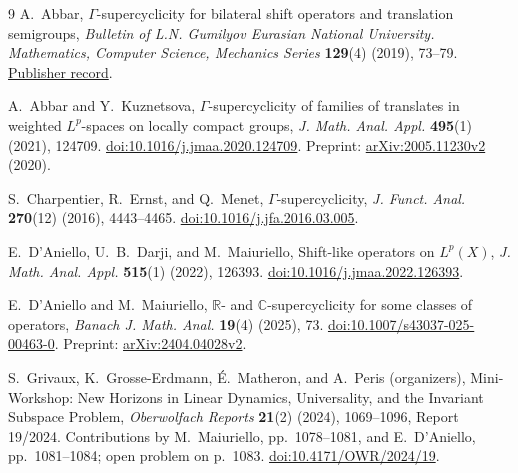 \documentclass[11pt]{article}
\theoremstyle{remark}
\begin{document}
\begin{thebibliography}{9}
A.~Abbar, $\Gamma$-supercyclicity for bilateral shift operators and translation semigroups, \emph{Bulletin of L.N. Gumilyov Eurasian National University. Mathematics, Computer Science, Mechanics Series} \textbf{129}(4) (2019), 73--79. \href{https://bulmathmc.enu.kz/index.php/main/article/view/55}{Publisher record}.

A.~Abbar and Y.~Kuznetsova, $\Gamma$-supercyclicity of families of translates in weighted $L^p$-spaces on locally compact groups, \emph{J. Math. Anal. Appl.} \textbf{495}(1) (2021), 124709. \href{https://doi.org/10.1016/j.jmaa.2020.124709}{doi:10.1016/j.jmaa.2020.124709}. Preprint: \href{https://arxiv.org/abs/2005.11230v2}{arXiv:2005.11230v2} (2020).

S.~Charpentier, R.~Ernst, and Q.~Menet, $\Gamma$-supercyclicity, \emph{J. Funct. Anal.} \textbf{270}(12) (2016), 4443--4465. \href{https://doi.org/10.1016/j.jfa.2016.03.005}{doi:10.1016/j.jfa.2016.03.005}.

E.~D'Aniello, U.~B.~Darji, and M.~Maiuriello, Shift-like operators on $L^p(X)$, \emph{J. Math. Anal. Appl.} \textbf{515}(1) (2022), 126393. \href{https://doi.org/10.1016/j.jmaa.2022.126393}{doi:10.1016/j.jmaa.2022.126393}.

E.~D'Aniello and M.~Maiuriello, $\mathbb R$- and $\mathbb C$-supercyclicity for some classes of operators, \emph{Banach J. Math. Anal.} \textbf{19}(4) (2025), 73. \href{https://doi.org/10.1007/s43037-025-00463-0}{doi:10.1007/s43037-025-00463-0}. Preprint: \href{https://arxiv.org/abs/2404.04028v2}{arXiv:2404.04028v2}.

S.~Grivaux, K.~Grosse-Erdmann, \'E.~Matheron, and A.~Peris (organizers), Mini-Workshop: New Horizons in Linear Dynamics, Universality, and the Invariant Subspace Problem, \emph{Oberwolfach Reports} \textbf{21}(2) (2024), 1069--1096, Report 19/2024. Contributions by M.~Maiuriello, pp.~1078--1081, and E.~D'Aniello, pp.~1081--1084; open problem on p.~1083. \href{https://doi.org/10.4171/OWR/2024/19}{doi:10.4171/OWR/2024/19}.
\end{thebibliography}
\end{document}
